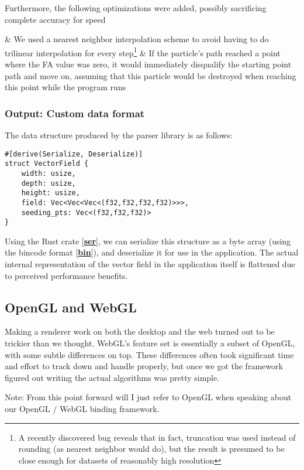 \documentclass{article}
\newcommand{\code}[1]{\fcolorbox{codebd}{codebg}{\lstinline[basicstyle=\ttfamily\color{codefg}]{#1}}}
\newcommand{\reference}[1]{[\hyperref[ref:#1]{\textbf{#1}}]}
\begin{document}
Furthermore, the following optimizations were added, possibly sacrificing complete accuracy for speed

\begin{easylist}[itemize]
& We used a nearest neighbor interpolation scheme to avoid having to do trilinear interpolation for every step\footnote{A recently discovered bug reveals that in fact, truncation was used instead of rounding (as nearest neighbor would do), but the result is presumed to be close enough for datasets of reasonably high resolution}
& If the particle's path reached a point where the FA value was zero, it would immediately disqualify the starting point path and move on, assuming that this particle would be destroyed when reaching this point while the program runs
\end{easylist}

\subsubsection*{Output: Custom data format}

The data structure produced by the parser library is as follows:

\begin{verbatim}
#[derive(Serialize, Deserialize)]
struct VectorField {
    width: usize,
    depth: usize,
    height: usize,
    field: Vec<Vec<Vec<(f32,f32,f32,f32)>>>,
    seeding_pts: Vec<(f32,f32,f32)>
}
\end{verbatim}

Using the Rust crate \code{serde} \reference{ser}, we can serialize this structure as a byte array (using the bincode format \reference{bin}), and deserialize it for use in the application. The actual internal representation of the vector field in the application itself is flattened due to perceived performance benefits.

\subsection*{OpenGL and WebGL}

Making a renderer work on both the desktop and the web turned out to be trickier than we thought. WebGL's feature set is essentially a subset of OpenGL, with some subtle differences on top. These differences often took significant time and effort to track down and handle properly, but once we got the framework figured out writing the actual algorithms was pretty simple.

Note: From this point forward will I just refer to OpenGL when speaking about our OpenGL / WebGL binding framework.
\end{document}

